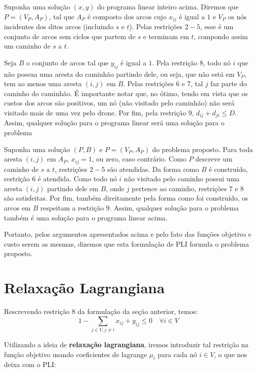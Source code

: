 \documentclass[11pt]{article}
\begin{document}
Suponha uma solução \((x,y)\) do programa linear inteiro acima. Diremos que \(P = (V_P, A_P)\), tal que \(A_P\) é composto dos arcos cujo \(x_{ij}\) é igual a \(1\) e \(V_P\) os nós incidentes dos ditos arcos (incluindo \(s\) e \(t\)). Pelas restrições \(2 - 5\), esse é um conjunto de arcos sem ciclos que partem de \(s\) e terminam em \(t\), compondo assim um caminho de \(s\) a \(t\).

Seja \(B\) o conjunto de arcos tal que \(y_{ij}\) é igual a \(1\). Pela restrição \(8\), todo nó \(i\) que não possua uma aresta do caminhão partindo dele, ou seja, que não está em \(V_P\), tem ao menos uma aresta \((i,j)\) em \(B\). Pelas restrições \(6\) e \(7\), tal \(j\) faz parte do caminho do caminhão. É importante notar que, no ótimo, tendo em vista que os custos dos arcos são positivos, um nó (não visitado pelo caminhão) não será visitado mais de uma vez pelo drone. Por fim, pela restrição \(9\), \(d_{ij} + d_{ji} \leq D\). Assim, qualquer solução para o programa linear será uma solução para o problema

Suponha uma solução \((P,B)\) e \(P = (V_P, A_P)\) do problema proposto. Para toda aresta \((i,j)\) em \(A_P\), \(x_{ij} = 1\), ou zero, caso contrário. Como \(P\) descreve um caminho de \(s\) a \(t\), restrições \(2-5\) são atendidas. Da forma como \(B\) é construído, restrição \(6\) é atendida. Como todo nó \(i\) não visitado pelo caminho possui uma aresta \((i,j)\) partindo dele em \(B\), onde \(j\) pertence ao caminho, restrições \(7\) e \(8\) são satisfeitas. Por fim, também direitamente pela forma como foi construído, os arcos em \(B\) respeitam a restrição \(9\). Assim, qualquer solução para o problema também é uma solução para o programa linear acima.

Portanto, pelos argumentos apresentados acima e pelo fato das funções objetivo e custo serem as mesmas, dizemos que esta formulação de PLI formula o problema proposto.

\section{Relaxação Lagrangiana}
\label{sec:orge6c5754}
Rescrevendo restrição \(8\) da formulação da seção anterior, temos:
$$
1 - \sum_{j \in V, j \neq i} x_{ij} + y_{ij} \leq 0 \quad \forall i \in V
$$

Utilizando a ideia de \textbf{relaxação lagrangiana}, iremos introduzir tal restrição na função objetivo usando coeficientes de lagrange \(\mu_i\) para cada nó \(i \in V\), o que nos deixa com o PLI:
\end{document}
